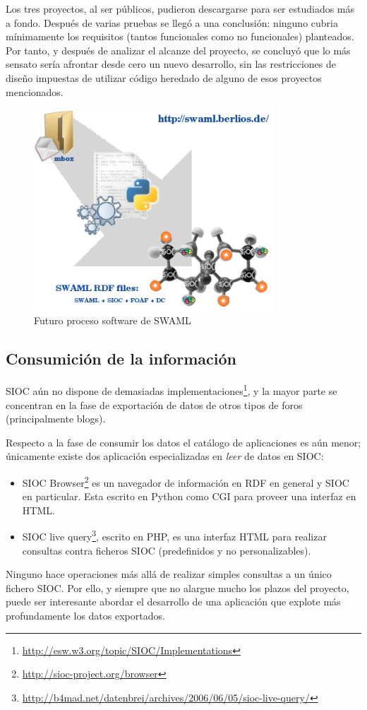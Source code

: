 Los tres proyectos, al ser públicos, pudieron descargarse para ser estudiados más a fondo. Después
de varias pruebas se llegó a una conclusión: ninguno cubria mínimamente los requisitos (tantos 
funcionales como no funcionales) planteados. Por tanto, y después de analizar el alcanze del
proyecto, se concluyó que lo más sensato sería afrontar desde cero un nuevo desarrollo, sin las 
restricciones de diseño impuestas de utilizar código heredado de alguno de esos proyectos 
mencionados.

\begin{figure}[H]
	\centering
	\includegraphics[width=9cm]{images/swaml-process.png}
	\caption{Futuro proceso software de SWAML}
	\label{fig:swamlProcess}
\end{figure}


\subsection{Consumición de la información}

SIOC aún no dispone de demasiadas implementaciones\footnote{\url{http://esw.w3.org/topic/SIOC/Implementations}},
y la mayor parte se concentran en la fase de exportación de datos de otros
tipos de foros (principalmente blogs). 

Respecto a la fase de consumir los datos el catálogo de aplicaciones es aún 
menor; únicamente existe dos aplicación especializadas en \emph{leer} de datos 
en SIOC:

\begin{itemize}
  \item SIOC Browser\footnote{\url{http://sioc-project.org/browser}} es un 
	navegador de información en RDF en general y SIOC en particular. 
	Esta escrito en Python como CGI para proveer una interfaz en HTML.
  \item SIOC live query\footnote{\url{http://b4mad.net/datenbrei/archives/2006/06/05/sioc-live-query/}},
	escrito en PHP, es una interfaz HTML para realizar consultas
	contra ficheros SIOC (predefinidos y no personalizables).
\end{itemize}

Ninguno hace operaciones más allá de realizar simples consultas a un único fichero 
SIOC. Por ello, y siempre que no alargue mucho los plazos del proyecto, puede ser 
interesante abordar el desarrollo de una aplicación que explote más profundamente
los datos exportados.
